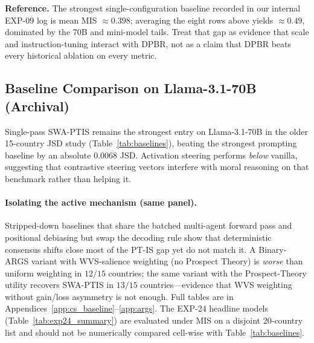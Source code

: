 \documentclass{article}
\begin{document}
\noindent\textbf{Reference.} The strongest single-configuration baseline recorded in
our internal EXP-09 log is mean MIS $\approx 0.398$; averaging the eight rows above
yields $\approx 0.49$, dominated by the 70B and mini-model tails. Treat that gap as
evidence that scale and instruction-tuning interact with DPBR, not as a claim that
DPBR beats every historical ablation on every metric.

\subsection{Baseline Comparison on Llama-3.1-70B (Archival)}

Single-pass SWA-PTIS remains the strongest entry on Llama-3.1-70B in the older
15-country JSD study (Table~\ref{tab:baselines}), beating the strongest prompting
baseline by an absolute $0.0068$ JSD. Activation steering performs \emph{below}
vanilla, suggesting that contrastive steering vectors interfere with moral
reasoning on that benchmark rather than helping it.

\paragraph{Isolating the active mechanism (same panel).}
Stripped-down baselines that share the batched multi-agent forward pass and
positional debiasing but swap the decoding rule show that deterministic consensus
shifts close most of the PT-IS gap yet do not match it. A Binary-ARGS variant with
WVS-salience weighting (no Prospect Theory) is \emph{worse} than uniform weighting
in $12/15$ countries; the same variant with the Prospect-Theory utility recovers
SWA-PTIS in $13/15$ countries---evidence that WVS weighting without gain/loss
asymmetry is not enough. Full tables are in Appendices~\ref{app:cs_baseline}--\ref{app:args}.
The EXP-24 headline models (Table~\ref{tab:exp24_summary}) are evaluated under MIS
on a disjoint 20-country list and should not be numerically compared cell-wise with
Table~\ref{tab:baselines}.
\end{document}
